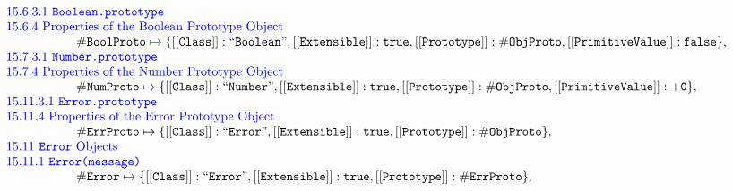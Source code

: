 \[\begin{array}{rl}
\multicolumn{2}{l}{\mbox{\inblue 15.6.3.1 {\tt Boolean.prototype}}}\\
\multicolumn{2}{l}{\mbox{\inblue 15.6.4 Properties of the Boolean Prototype Object}}\\
\multicolumn{2}{l}{\phantom{\emph{InitHeap} = \{}
{\tt\#BoolProto} \mapsto \{{\tt [[Class]]: ``Boolean"}, {\tt [[Extensible]]: \true}, {\tt [[Prototype]]: \#ObjProto}, {\tt [[PrimitiveValue]]: \false} \},}\\


\multicolumn{2}{l}{\mbox{\inblue 15.7.3.1 {\tt Number.prototype}}}\\
\multicolumn{2}{l}{\mbox{\inblue 15.7.4 Properties of the Number Prototype Object}}\\
\multicolumn{2}{l}{\phantom{\emph{InitHeap} = \{}
{\tt\#NumProto} \mapsto \{{\tt [[Class]]: ``Number"}, {\tt [[Extensible]]: \true}, {\tt [[Prototype]]: \#ObjProto},
{\tt [[PrimitiveValue]]: {\tt+0}} \},}\\%

\multicolumn{2}{l}{\mbox{\inblue 15.11.3.1 {\tt Error.prototype}}}\\
\multicolumn{2}{l}{\mbox{\inblue 15.11.4 Properties of the Error Prototype Object}}\\
\multicolumn{2}{l}{\phantom{\emph{InitHeap} = \{}
{\tt\#ErrProto} \mapsto \{{\tt [[Class]]: ``Error"}, {\tt [[Extensible]]: \true}, {\tt [[Prototype]]: \#ObjProto}
\},}\\%

\multicolumn{2}{l}{\mbox{\inblue 15.11 {\tt Error} Objects}}\\
\multicolumn{2}{l}{\mbox{\inblue 15.11.1 {\tt Error(message)}}}\\
\multicolumn{2}{l}{\phantom{\emph{InitHeap} = \{}
{\tt\#Error} \mapsto \{{\tt [[Class]]: ``Error"}, {\tt [[Extensible]]: \true}, {\tt [[Prototype]]: \#ErrProto}
\},}\\%


\end{array}
\]


